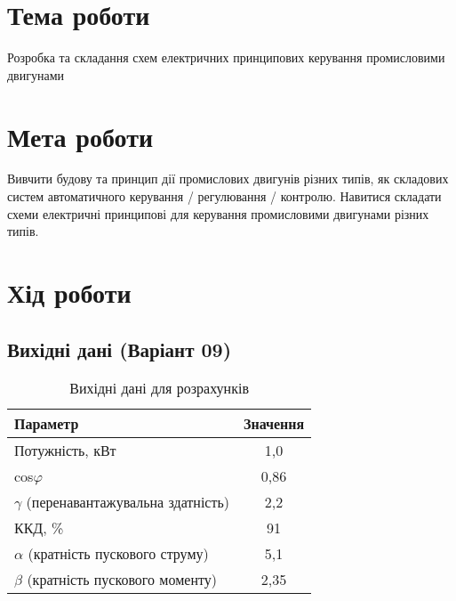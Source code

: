 \documentclass[a4paper]{article}
\begin{document}

    \section*{Тема роботи}
    Розробка та складання схем електричних принципових керування
    промисловими двигунами

    \section*{Мета роботи}
   
    Вивчити будову та принцип дії промислових двигунів
різних типів, як складових систем автоматичного
керування / регулювання / контролю. Навитися складати схеми електричні
принципові для керування промисловими двигунами різних типів.

    \section*{Хід роботи}

    \subsection*{Вихідні дані (Варіант 09)}
\begin{table}[h!]
    \centering
    \begin{tabular}{|l|c|}
        \hline
        \textbf{Параметр} & \textbf{Значення} \\
        \hline
        Потужність, кВт & 1,0 \\
        \hline
        cos$\varphi$ & 0,86 \\
        \hline
        \hline
        $\gamma$ (перенавантажувальна здатність) & 2,2 \\
        \hline
        ККД, \% & 91 \\
        \hline
        $\alpha$ (кратність пускового струму) & 5,1 \\
        \hline
        $\beta$ (кратність пускового моменту) & 2,35 \\
        \hline
    \end{tabular}
    \caption{Вихідні дані для розрахунків}
\end{table}
\end{document}
